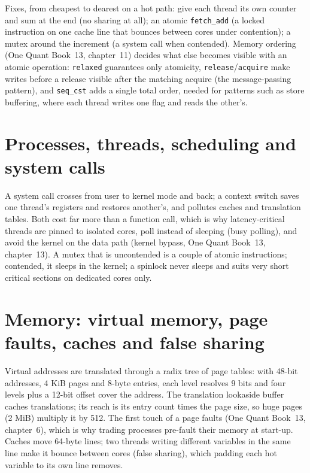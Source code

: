 Fixes, from cheapest to dearest on a hot path: give each thread its own counter and sum at the end (no sharing at all); an atomic
\texttt{fetch\_add} (a locked instruction on one cache line that bounces between cores under contention); a mutex around the
increment (a system call when contended). Memory ordering (One Quant Book~13, chapter~11) decides what else becomes visible with an
atomic operation: \texttt{relaxed} guarantees only atomicity, \texttt{release}/\texttt{acquire} make writes before a release visible
after the matching acquire (the message-passing pattern), and \texttt{seq\_cst} adds a single total order, needed for patterns
such as store buffering, where each thread writes one flag and reads the other's.

\label{lst:iv:concurrency-operating-systems-and-networks:spsc}

\section{Processes, threads, scheduling and system calls}

A system call crosses from user to kernel mode and back; a context switch saves one thread's registers and restores another's,
and pollutes caches and translation tables. Both cost far more than a function call, which is why latency-critical threads are
pinned to isolated cores, poll instead of sleeping (busy polling), and avoid the kernel on the data path (kernel bypass, One Quant
Book~13, chapter~13). A mutex that is uncontended is a couple of atomic instructions; contended, it sleeps in the kernel; a spinlock
never sleeps and suits very short critical sections on dedicated cores only.

\section{Memory: virtual memory, page faults, caches and false sharing}

Virtual addresses are translated through a radix tree of page tables: with 48-bit addresses, 4 KiB pages and 8-byte entries, each
level resolves 9 bits and four levels plus a 12-bit offset cover the address. The translation lookaside buffer caches
translations; its reach is its entry count times the page size, so huge pages (2 MiB) multiply it by 512. The first touch of a page
faults (One Quant Book~13, chapter~6), which is why trading processes pre-fault their memory at start-up. Caches move 64-byte lines;
two threads writing different variables in the same line make it bounce between cores (false sharing), which padding each hot
variable to its own line removes.


